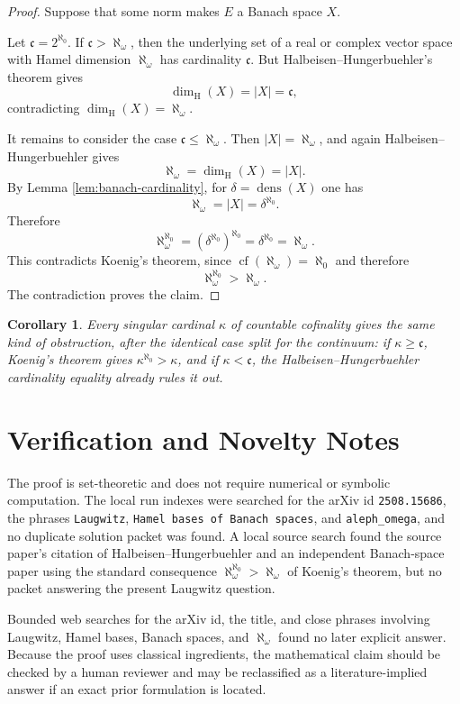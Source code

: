 \documentclass[11pt]{article}
\newtheorem{corollary}{Corollary}
\newcommand{\dens}{\operatorname{dens}}
\newcommand{\cf}{\operatorname{cf}}
\begin{document}
\begin{proof}
Suppose that some norm makes \(E\) a Banach space \(X\).

Let \(\mathfrak c=2^{\aleph_0}\).  If \(\mathfrak c>\aleph_\omega\), then the
underlying set of a real or complex vector space with Hamel dimension
\(\aleph_\omega\) has cardinality \(\mathfrak c\).  But
Halbeisen--Hungerbuehler's theorem gives
\[
  \dim_{\mathrm H}(X)=|X|=\mathfrak c,
\]
contradicting \(\dim_{\mathrm H}(X)=\aleph_\omega\).

It remains to consider the case \(\mathfrak c\leq\aleph_\omega\).  Then
\(|X|=\aleph_\omega\), and again
Halbeisen--Hungerbuehler gives
\[
  \aleph_\omega=\dim_{\mathrm H}(X)=|X|.
\]
By Lemma \ref{lem:banach-cardinality}, for
\(\delta=\dens(X)\) one has
\[
  \aleph_\omega=|X|=\delta^{\aleph_0}.
\]
Therefore
\[
  \aleph_\omega^{\aleph_0}
  =(\delta^{\aleph_0})^{\aleph_0}
  =\delta^{\aleph_0}
  =\aleph_\omega.
\]
This contradicts Koenig's theorem, since \(\cf(\aleph_\omega)=\aleph_0\) and
therefore
\[
  \aleph_\omega^{\aleph_0}>\aleph_\omega.
\]
The contradiction proves the claim.
\end{proof}

\begin{corollary}
Every singular cardinal \(\kappa\) of countable cofinality gives the same
kind of obstruction, after the identical case split for the continuum:
if \(\kappa\geq\mathfrak c\), Koenig's theorem gives
\(\kappa^{\aleph_0}>\kappa\), and if \(\kappa<\mathfrak c\), the
Halbeisen--Hungerbuehler cardinality equality already rules it out.
\end{corollary}

\section*{Verification and Novelty Notes}

The proof is set-theoretic and does not require numerical or symbolic
computation.  The local run indexes were searched for the arXiv id
\texttt{2508.15686}, the phrases \texttt{Laugwitz},
\texttt{Hamel bases of Banach spaces}, and \texttt{aleph\_omega}, and no
duplicate solution packet was found.  A local source search found the source
paper's citation of Halbeisen--Hungerbuehler and an independent Banach-space
paper using the standard consequence
\(\aleph_\omega^{\aleph_0}>\aleph_\omega\) of Koenig's theorem, but no packet
answering the present Laugwitz question.

Bounded web searches for the arXiv id, the title, and close phrases involving
Laugwitz, Hamel bases, Banach spaces, and \(\aleph_\omega\) found no later
explicit answer.  Because the proof uses classical ingredients, the
mathematical claim should be checked by a human reviewer and may be
reclassified as a literature-implied answer if an exact prior formulation is
located.
\end{document}
